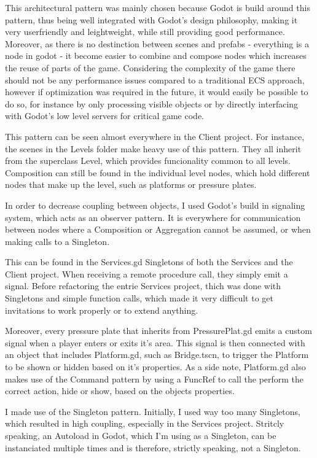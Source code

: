 \documentclass{article}
\begin{document}
This architectural pattern was mainly chosen because Godot is build around this pattern, thus being well integrated with Godot's design philosophy, making it very userfriendly and leightweight, while still providing good performance. Moreover, as there is no destinction between scenes and prefabs - everything is a node in godot - it become easier to combine and compose nodes which increases the reuse of parts of the game. Considering the complexity of the game there should not be any performance issues compared to a traditional ECS approach, however if optimization was required in the future, it would easily be possible to do so, for instance  by only processing visible objects or by directly interfacing with Godot's low level servers for critical game code. 

This pattern can be seen almost everywhere in the Client project. For instance, the scenes in the Levels folder make heavy use of this pattern. They all inherit from the superclass Level, which provides funcionality common to all levels. Composition can still be found in the individual level nodes, which hold different nodes that make up the level, such as platforms or pressure plates.

\bigskip
In order to decrease coupling between objects, I used Godot's build in signaling system, which acts as an observer pattern. It is everywhere for communication between nodes where a Composition or Aggregation cannot be assumed, or when making calls to a Singleton. 

This can be found in the Services.gd Singletons of both the Services and the Client project. When receiving a remote procedure call, they simply emit a signal. Before refactoring the entrie Services project, thich was done with Singletons and simple function calls, which made it very difficult to get invitations to work properly or to extend anything. 

Moreover, every pressure plate that inherits from PressurePlat.gd emits a custom signal when a player enters or exits it's area. This signal is then connected with an object that includes Platform.gd, such as Bridge.tscn, to trigger the Platform to be shown or hidden based on it's properties. As a side note, Platform.gd also makes use of the Command pattern by using a FuncRef to call the perform the correct action, hide or show, based on the objects properties.


\bigskip
I made use of the Singleton pattern. Initially, I used way too many Singletons, which resulted in high coupling, especially in the Services project. Stritcly speaking, an Autoload in Godot, which I'm using as a Singleton, can be instanciated multiple times and is therefore, strictly speaking, not a Singleton.
\end{document}
